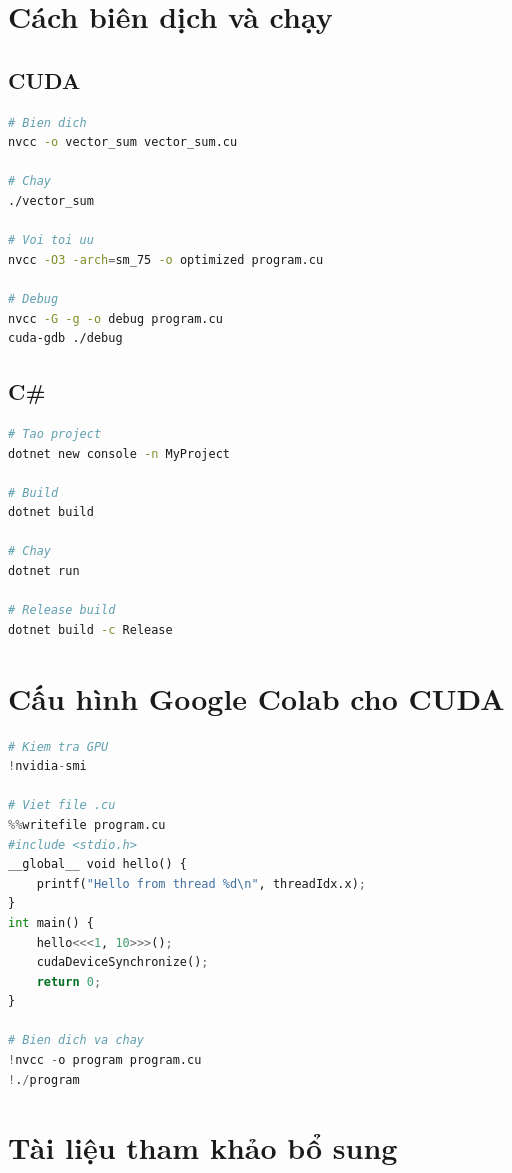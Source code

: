 \section{Cách biên dịch và chạy}

\subsection{CUDA}

\begin{lstlisting}[language=bash, caption={Biên dịch và chạy CUDA}]
# Bien dich
nvcc -o vector_sum vector_sum.cu

# Chay
./vector_sum

# Voi toi uu
nvcc -O3 -arch=sm_75 -o optimized program.cu

# Debug
nvcc -G -g -o debug program.cu
cuda-gdb ./debug
\end{lstlisting}

\subsection{C\#}

\begin{lstlisting}[language=bash, caption={Biên dịch và chạy C\#}]
# Tao project
dotnet new console -n MyProject

# Build
dotnet build

# Chay
dotnet run

# Release build
dotnet build -c Release
\end{lstlisting}

\section{Cấu hình Google Colab cho CUDA}

\begin{lstlisting}[language=python, caption={Setup CUDA trên Google Colab}]
# Kiem tra GPU
!nvidia-smi

# Viet file .cu
%%writefile program.cu
#include <stdio.h>
__global__ void hello() {
    printf("Hello from thread %d\n", threadIdx.x);
}
int main() {
    hello<<<1, 10>>>();
    cudaDeviceSynchronize();
    return 0;
}

# Bien dich va chay
!nvcc -o program program.cu
!./program
\end{lstlisting}

\section{Tài liệu tham khảo bổ sung}

